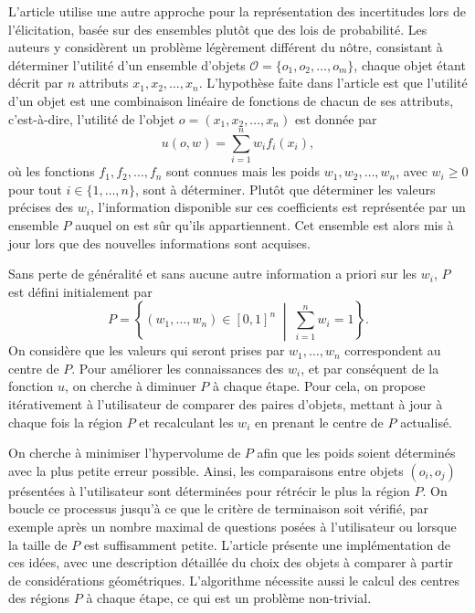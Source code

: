 \documentclass[a4paper,11pt]{article}
\theoremstyle{plain}
\theoremstyle{definition}
\begin{document}
L'article \cite{iyengar_q-eval_2001} utilise une autre approche pour la représentation des incertitudes lors de l'élicitation, basée sur des ensembles plutôt que des lois de probabilité. Les auteurs y considèrent un problème légèrement différent du nôtre, consistant à déterminer l'utilité d'un ensemble d'objets $\mathcal O = \{o_1, o_2, \dotsc, o_m\}$, chaque objet étant décrit par $n$ attributs $x_1, x_2, \dotsc, x_n$. L'hypothèse faite dans l'article est que l'utilité d'un objet est une combinaison linéaire de fonctions de chacun de ses attributs, c'est-à-dire, l'utilité de l'objet $o = (x_1, x_2, \dotsc, x_n)$ est donnée par
\[u(o, w) = \sum_{i = 1}^{n} w_i f_i(x_i),\]
où les fonctions $f_1, f_2, \dotsc, f_n$ sont connues mais les poids $w_1, w_2, \dotsc, w_n$, avec $w_i \geq 0$ pour tout $i \in \{1, \dotsc, n\}$, sont à déterminer. Plutôt que déterminer les valeurs précises des $w_i$, l'information disponible sur ces coefficients est représentée par un ensemble $P$ auquel on est sûr qu'ils appartiennent. Cet ensemble est alors mis à jour lors que des nouvelles informations sont acquises.

Sans perte de généralité et sans aucune autre information a priori sur les $w_i$, $P$ est défini initialement par
\[P = \left\{(w_1, \dotsc, w_n) \in [0, 1]^n \;\middle\vert\; \sum_{i=1}^n w_i = 1\right\}.\]
%
On considère que les valeurs qui seront prises par $w_1, \dotsc, w_n$ correspondent au centre de $P$. Pour améliorer les connaissances des $w_i$, et par conséquent de la fonction $u$, on cherche à diminuer $P$ à chaque étape. Pour cela, on propose itérativement à l'utilisateur de comparer des paires d'objets, mettant à jour à chaque fois la région $P$ et recalculant les $w_i$ en prenant le centre de $P$ actualisé.

On cherche à minimiser l'hypervolume de $P$ afin que les poids soient déterminés avec la plus petite erreur possible. Ainsi, les comparaisons entre objets $(o_i, o_j)$ présentées à l'utilisateur sont déterminées pour rétrécir le plus la région $P$. On boucle ce processus jusqu'à ce que le critère de terminaison soit vérifié, par exemple après un nombre maximal de questions posées à l'utilisateur ou lorsque la taille de $P$ est suffisamment petite. L'article \cite{iyengar_q-eval_2001} présente une implémentation de ces idées, avec une description détaillée du choix des objets à comparer à partir de considérations géométriques. L'algorithme nécessite aussi le calcul des centres des régions $P$ à chaque étape, ce qui est un problème non-trivial.
\end{document}
